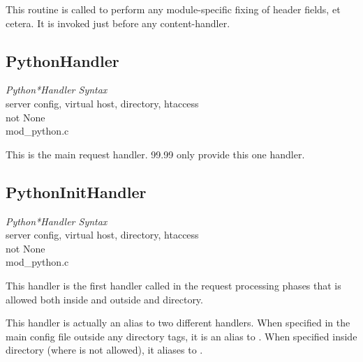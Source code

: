 This routine is called to perform any module-specific fixing of header
fields, et cetera. It is invoked just before any content-handler.

\subsection{PythonHandler\label{dir-handlers-ph}}

\emph{Python*Handler Syntax}\\
server config, virtual host, directory, htaccess\\
not None\\
mod_python.c

This is the main request handler. 99.99%
only provide this one handler.

\subsection{PythonInitHandler\label{dir-handlers-pih}}

\emph{Python*Handler Syntax}\\
server config, virtual host, directory, htaccess\\
not None\\
mod_python.c

This handler is the first handler called in the request processing
phases that is allowed both inside and outside  and
directory.

This handler is actually an alias to two different handlers. When
specified in the main config file outside any directory tags, it is an
alias to . When specified inside directory
(where  is not allowed), it aliases to
.

